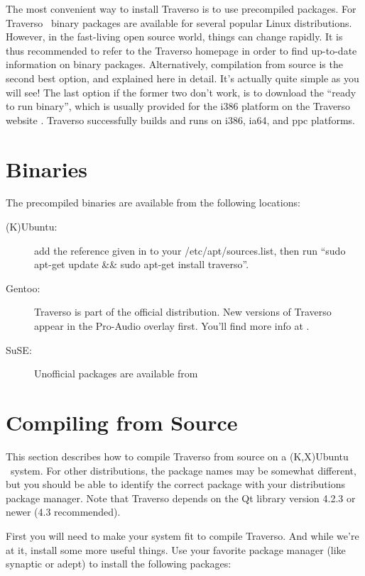 The most convenient way to install Traverso is to use precompiled packages. For Traverso \Version\ binary packages are available for several popular Linux distributions. However, in the fast-living open source world, things can change rapidly. It is thus recommended to refer to the Traverso homepage in order to find up-to-date information on binary packages. Alternatively, compilation from source is the second best option, and explained here in detail. It's actually quite simple as you will see! The last option if the former two don't work, is to download the ``ready to run binary'', which is usually provided for the i386 platform on the Traverso website \cite{trav-hp}. Traverso successfully builds and runs on i386, ia64, and ppc platforms.

\section{Binaries}
The precompiled binaries are available from the following locations:

\begin{description}
	\item [(K)Ubuntu:] add the reference given in \cite{trav-repo} to your /etc/apt/sources.list, then run ``sudo apt-get update \&\& sudo apt-get install traverso''.
	\item [Gentoo:] Traverso is part of the official distribution. New versions of Traverso appear in the Pro-Audio overlay first. You'll find more info at \cite{pro-audio-wiki}.
	\item [SuSE:] Unofficial packages are available from \cite{jacklab-ref}
\end{description}

\section{Compiling from Source}
This section describes how to compile Traverso from source on a (K,X)Ubuntu \Ubuntu\ system. For other distributions, the package names may be somewhat different, but you should be able to identify the correct package with your distributions package manager. Note that Traverso depends on the Qt library version 4.2.3 or newer (4.3 recommended).

First you will need to make your system fit to compile Traverso. And while we're at it, install some more useful things. Use your favorite package manager (like synaptic or adept) to install the following packages:

